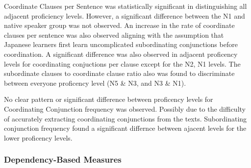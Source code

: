 
Coordinate Clauses per Sentence was statistically significant in distinguishing all adjacent proficiency levels.
However, a significant difference between the N1 and native speaker group was not observed. An increase in the rate
of coordinate clauses per sentence was also observed aligning with the assumption that Japanese learners first learn
uncomplicated subordinating conjunctions before coordination. A significant difference was also observed in adjacent
proficency levels for coordinating conjuctions per clause except for the N2, N1 levels. The subordinate clauses to
coordinate clause ratio also was found to discriminate between everyone proficency level (N5 & N3, and N3 & N1).



No clear pattern or significant difference between proficency levels for Coordinating Conjunction frequency was
observed. Possibly due to the difficulty of accurately extracting coordinating conjunctions from the texts.
Subordinating conjunction frequency found a significant differnce between ajacent levels for the lower proficency
levels.


\subsubsection{Dependency-Based Measures}

